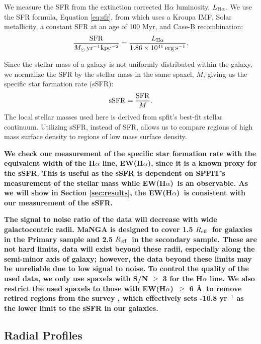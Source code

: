 \documentclass[iop,revtex4,twocolumn,apj,numberedappendix,appendixfloats]{emulateapj}
\newcommand{\reff}{$R_{\rm eff}$}
\newcommand{\ewha}{EW(H$\alpha$)}
\begin{document}
We measure the SFR from the extinction corrected H$\alpha$ luminosity, $L_{{\rm H}\alpha}$. We use the SFR formula, Equation \ref{eq:sfr}, from \citet{Murphy:2011} which uses a Kroupa IMF, Solar metallicity, a constant SFR at an age of 100 Myr, and Case-B recombination: 
\begin{equation}\label{eq:sfr}
\frac{\rm{SFR}}{M_{\odot} \, \rm{yr^{-1} kpc^{-2}}} = \frac{L_{\rm H\alpha}}{1.86 \times 10^{41}\, \rm{erg\,s}^{-1}}.
\end{equation}

Since the stellar mass of a galaxy is not uniformly distributed within the galaxy, we normalize the SFR by the stellar mass in the same spaxel, $M$, giving us the specific star formation rate (sSFR):
\begin{equation}
{\rm sSFR} = \frac{\rm SFR}{M}.
\end{equation}
The local stellar masses used here is derived from {\sc spfit}'s best-fit stellar continuum. Utilizing sSFR, instead of SFR, allows us to compare regions of high mass surface density to regions of low mass surface density. 

\textbf{
We check our measurement of the specific star formation rate with the equivalent width of the H$\alpha$ line, \ewha, since it is a known proxy for the sSFR. This is useful as the sSFR is dependent on {\sc SPFIT}'s measurement of the stellar mass while \ewha\ is an observable. As we will show in Section \ref{sec:results}, the \ewha\ is consistent with our measurement of the sSFR.
}

\textbf{
The signal to noise ratio of the data will decrease with wide galactocentric radii. MaNGA is designed to cover 1.5 \reff\ for galaxies in the Primary sample and 2.5 \reff\ in the secondary sample. These are not hard limits, data will exist beyond these radii, especially along the semi-minor axis of galaxy; however, the data beyond these limits may be unreliable due to low signal to noise. To control the quality of the used data, we only use spaxels with S/N $\ge$ 3 for the H$\alpha$ line. We also restrict the used spaxels to those with \ewha\ $\ge$ 6 \AA\ to remove retired regions from the survey \citep{Cid-Fernandes:2011}, which effectively sets -10.8 yr$^{-1}$ as the lower limit to the sSFR in our galaxies.
}

\subsection{Radial Profiles}\label{sec:radial}
\end{document}
